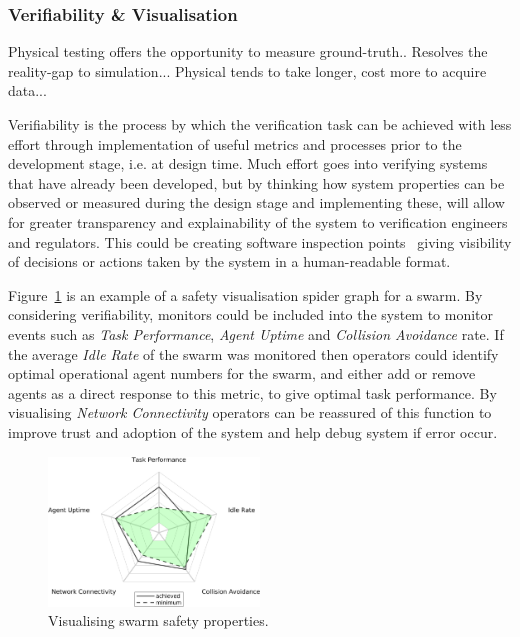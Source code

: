 \documentclass[lettersize,journal]{IEEEtran}
\begin{document}
\subsubsection*{Verifiability \& Visualisation}

Physical testing offers the opportunity to measure ground-truth..
Resolves the reality-gap to simulation...
Physical tends to take longer, cost more to acquire data...

Verifiability is the process by which the verification task can be achieved with less effort through implementation of useful metrics and processes prior to the  development stage, i.e. at design time. Much effort goes into verifying systems that have already been developed, but by thinking how system properties can be observed or measured during the design stage and implementing these, will allow for greater transparency and explainability of the system to verification engineers and regulators. This could be creating software inspection points~\cite{koopman2018toward} giving visibility of decisions or actions taken by the system in a human-readable format. 

Figure~\ref{swarm_trust_spider} is an example of a safety visualisation spider graph for a swarm. By considering verifiability, monitors could be included into the system to monitor events such as \emph{Task Performance}, \emph{Agent Uptime} and \emph{Collision Avoidance} rate. If the average \emph{Idle Rate} of the swarm was monitored then operators could identify optimal operational agent numbers for the swarm, and either add or remove agents as a direct response to this metric, to give optimal task performance. By visualising \emph{Network Connectivity} operators can be reassured of this function to improve trust and adoption of the system and help debug system if error occur. 

\begin{figure}
	\centering
	\includegraphics[width=0.5\textwidth]{figures/swarm_trust_spider.png}
	\caption{Visualising swarm safety properties.}
	\label{swarm_trust_spider}
\end{figure}
\end{document}
